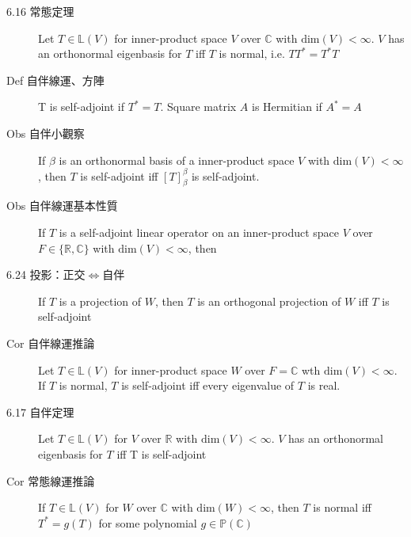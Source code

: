 \documentclass[8pt, twocolumn]{extarticle}
\newcommand{\vsdim}{\ensuremath{\text{dim}}}
\newcommand{\realnum}{\mathbb{R}}
\newcommand{\complexnum}{\mathbb{C}}
\newcommand{\ltrans}{\mathbb{L}}
\newcommand{\polynom}{\mathbb{P}}
\begin{document}
\begin{description}
    \item[6.16 常態定理] Let $T\in \ltrans(V)$ for inner-product space $V$ over $\complexnum$ with $\vsdim(V) < \infty$. $V$ has an orthonormal eigenbasis for $T$ iff $T$ is normal, i.e. $TT^*=T^*T$
    \item[Def 自伴線運、方陣] T is self-adjoint if $T^* = T$. Square matrix $A$ is Hermitian if $A^*=A$
    \item[Obs 自伴小觀察] If $\beta$ is an orthonormal basis of a inner-product space $V$ with $\vsdim(V) < \infty$, then $T$ is self-adjoint iff $[T]^\beta_\beta$ is self-adjoint.
    \item[Obs 自伴線運基本性質] If $T$ is a self-adjoint linear operator on an inner-product space $V$ over $F \in \{\realnum, \complexnum\}$ with $\vsdim(V)<\infty$, then
    \item[6.24 投影：正交$\Leftrightarrow$自伴] If $T$ is a projection of $W$, then $T$ is an orthogonal projection of $W$ iff $T$ is self-adjoint
    \item[Cor 自伴線運推論] Let $T \in \ltrans(V)$ for inner-product space $W$ over $F = \complexnum$ wth $\vsdim(V) < \infty$. If $T$ is normal, $T$ is self-adjoint iff every eigenvalue of $T$ is real.
    \item[6.17 自伴定理] Let $T \in \ltrans(V)$ for $V$ over $\realnum$ with $\vsdim(V)<\infty$. $V$ has an orthonormal eigenbasis for $T$ iff T is self-adjoint
    \item[Cor 常態線運推論] If $T\in \ltrans(V)$ for $W$ over $\complexnum$ with $\vsdim(W)< \infty$, then $T$ is normal iff $T^* = g(T)$ for some polynomial $g \in \polynom(\complexnum)$



\end{description}
\end{document}
